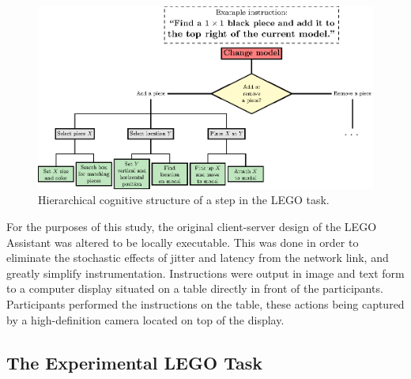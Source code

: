 \begin{figure}[h]
  \centering
  \includegraphics[width=\textwidth]{publications/2021ImpactDelayedResponse/Fig3.eps}
  \caption{Hierarchical cognitive structure of a step in the LEGO task.}
  \label{fig:lego:hierarchical}
\end{figure}


For the purposes of this study, the original client-server design of the LEGO Assistant was altered to be locally executable.
This was done in order to eliminate the stochastic effects of jitter and latency from the network link, and greatly simplify instrumentation.
Instructions were output in image and text form to a computer display situated on a table directly in front of the participants.
Participants performed the instructions on the table, these actions being captured by a high-definition camera located on top of the display.


\subsection{The Experimental LEGO Task}


